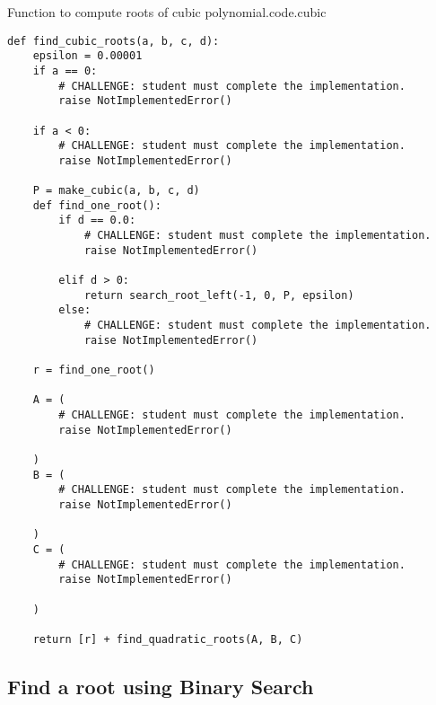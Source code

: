\begin{listing}{Function to compute roots of cubic polynomial.}{code.cubic}
\begin{minipage}[c]{0.98\textwidth}\begin{lstlisting}
def find_cubic_roots(a, b, c, d):
    epsilon = 0.00001
    if a == 0:
        # CHALLENGE: student must complete the implementation.
        raise NotImplementedError()

    if a < 0:
        # CHALLENGE: student must complete the implementation.
        raise NotImplementedError()

    P = make_cubic(a, b, c, d)
    def find_one_root():
        if d == 0.0:
            # CHALLENGE: student must complete the implementation.
            raise NotImplementedError()

        elif d > 0:
            return search_root_left(-1, 0, P, epsilon)
        else:
            # CHALLENGE: student must complete the implementation.
            raise NotImplementedError()

    r = find_one_root()

    A = (
        # CHALLENGE: student must complete the implementation.
        raise NotImplementedError()

    )
    B = (
        # CHALLENGE: student must complete the implementation.
        raise NotImplementedError()

    )
    C = (
        # CHALLENGE: student must complete the implementation.
        raise NotImplementedError()

    )

    return [r] + find_quadratic_roots(A, B, C)
\end{lstlisting}\end{minipage}\end{listing}

\subsection{Find a root using Binary Search}
\label{sec.binary.search}
